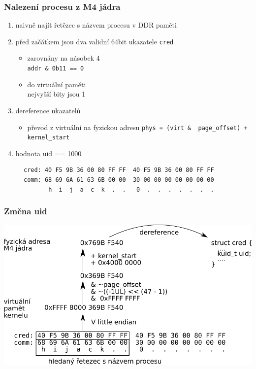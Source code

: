 \documentclass{beamer}
\begin{document}
\begin{frame}[fragile]
\frametitle{Nalezení procesu z M4 jádra}
\begin{enumerate}
	\item naivně najít řetězec s názvem procesu v DDR paměti
	\item před začátkem jsou dva validní 64bit ukazatele \texttt{cred}
	\begin{itemize}
		\item zarovnány na násobek 4 \\ \texttt{addr & 0b11 == 0}
		\item do virtuální paměti \\ 
		nejvyšší bity jsou 1
	\end{itemize}
	\item dereference ukazatelů
		\begin{itemize}
		\item převod z virtuální na fyzickou adresu
		 \texttt{phys = (virt & ~page_offset) + kernel_start}
	\end{itemize}
	\item hodnota uid == 1000
\end{enumerate}
\begin{figure}
	\begin{verbatim}
cred: 40 F5 9B 36 00 80 FF FF  40 F5 9B 36 00 80 FF FF
comm: 68 69 6A 61 63 6B 00 00  30 00 00 00 00 00 00 00
       h  i  j  a  c  k  .  .   0  .  .  .  .  .  .  .
	\end{verbatim}
\end{figure}
\end{frame}

\begin{frame}
\frametitle{Změna uid}
\includegraphics[width=\linewidth]{figures/hexdump.pdf}
\end{frame}
\end{document}
